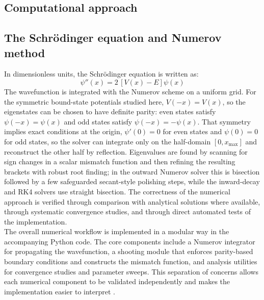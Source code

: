 \documentclass[11pt]{article}
\begin{document}
\begin{refsection}
    \section{Computational approach}
        \subsection{The Schr\"odinger equation and Numerov method}
            In dimensionless units, the Schr\"odinger equation is written as:
            \begin{equation}
            \psi''(x) = 2\,[V(x)-E]\psi(x)
            \end{equation}
            The wavefunction is integrated with the Numerov scheme on a uniform grid. For the symmetric bound-state potentials studied here, $V(-x)=V(x)$, so the eigenstates can be chosen to have definite parity: even states satisfy $\psi(-x)=\psi(x)$ and odd states satisfy $\psi(-x)=-\psi(x)$. That symmetry implies exact conditions at the origin, $\psi'(0)=0$ for even states and $\psi(0)=0$ for odd states, so the solver can integrate only on the half-domain $[0,x_{\max}]$ and reconstruct the other half by reflection. Eigenvalues are found by scanning for sign changes in a scalar mismatch function and then refining the resulting brackets with robust root finding; in the outward Numerov solver this is bisection followed by a few safeguarded secant-style polishing steps, while the inward-decay and RK4 solvers use straight bisection. The correctness of the numerical approach is verified through comparison with analytical solutions where available, through systematic convergence studies, and through direct automated tests of the implementation. \\

            The overall numerical workflow is implemented in a modular way in the accompanying Python code. The core components include a Numerov integrator for propagating the wavefunction, a shooting module that enforces parity-based boundary conditions and constructs the mismatch function, and analysis utilities for convergence studies and parameter sweeps. This separation of concerns allows each numerical component to be validated independently and makes the implementation easier to interpret \cite{Pang_2006}.


\end{refsection}
\end{document}
